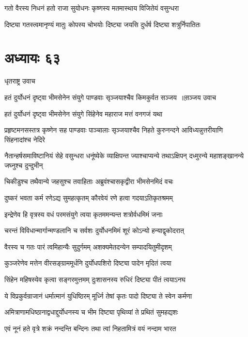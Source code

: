 \twolineshloka
{गतो वैरस्य निधनं हतो राजा सुयोधनः}
{कृष्णस्य मतमास्थाय विजितेयं वसुन्धरा}


\twolineshloka
{दिष्ट्या गतस्त्वमानृण्यं मातुः कोपस्य चोभयोः}
{दिष्ट्या जयसि दुर्धर्ष दिष्ट्या शत्रुर्निपातितः}


\chapter{अध्यायः ६३}
\twolineshloka
{धृतराष्ट्र उवाच}
{}


\threelineshloka
{हतं दुर्योधनं दृष्ट्वा भीमसेनेन संयुगे}
{पाण्डवाः सृञ्जयाश्चैव किमकुर्वत सञ्जय ॥स़ञ्जय उवाच}
{}


\twolineshloka
{हतं दुर्योधनं दृष्ट्वा भीमसेनेन संयुगे}
{सिंहेनेव महाराज मत्तं वनगजं यथा}


\threelineshloka
{प्रहृष्टमनसस्तत्र कृष्णेन सह पाण्डवाः}
{पाञ्चालाः सृञ्जयाश्चैव निहते कुरुनन्दने}
{आविध्यन्नुत्तरीयाणि सिंहनादांश्च नेदिरे}


नैतान्हर्षसमाविष्टानियं सेहे वसुन्धरा
\twolineshloka
{धनूंष्येके व्याक्षिपन्त ज्याश्चाप्यन्ये तथाऽक्षिपन्}
{दध्मुरन्ये महाशङ्खानन्ये जघ्नुश्च दुन्दुभीन्}


\twolineshloka
{चिकीडुश्च तथैवान्ये जहसुश्च तवाहिताः}
{अब्रुवंश्चासकृद्वीरा भीमसेनमिदं वचः}


\twolineshloka
{दुष्करं भवता कर्म रणेऽद्य सुमहत्कृतम्}
{कौरवेयं रणे हत्वा गदयाऽतिकृतश्रमम्}


\twolineshloka
{इन्द्रेणेव हि वृत्रस्य वधं परमसंयुगे}
{त्वया कृतममन्यन्त शत्रोर्वधमिमं जनाः}


\twolineshloka
{चरन्तं विविधान्मार्गान्मण्डलानि च सर्वशः}
{दुर्योधनमिमं शूरं कोऽन्यो हन्याद्वृकोदरात्}


\twolineshloka
{वैरस्य च गतः पारं त्वमिहान्यैः सुदुर्गमम्}
{अशक्यमेतदन्येन सम्पादयितुमीदृशम्}


\twolineshloka
{कुञ्जरेणेव मत्तेन वीरसङ्ग्राममूर्धनि}
{दुर्योधपशिरो दिष्ट्या पादेन मृदितं त्वया}


\twolineshloka
{सिंहेन महिषस्येव कृत्वा सङ्गरमुत्तमम्}
{दुःशासनस्य रुधिरं दिष्ट्या पीतं त्वयाऽनघ}


\twolineshloka
{ये विप्रकुर्वन्राजानं धर्मात्मानं युधिष्ठिरम्}
{मूर्ध्नि तेषां कृतः पादो दिष्ट्या ते स्वेन कर्मणा}


\twolineshloka
{अमित्राणामधिष्ठानाद्वधाद्दुर्योधनस्य च}
{भीम दिष्ट्या पृथिव्यां ते प्रथितं सुमहद्यशः}


\twolineshloka
{एवं नूनं हते वृत्रे शक्रं नन्दन्ति बन्दिनः}
{तथा त्वां निहतामित्रं वयं नन्दाम भारत}


